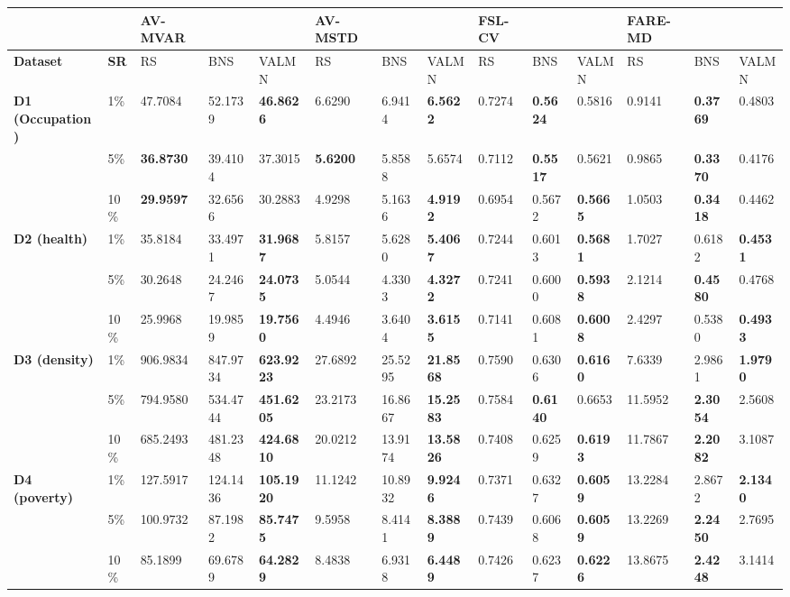 \begin{longtable}[]{@{}llllllllllllll@{}}
\toprule
& & AV-MVAR & & & AV-MSTD & & & FSL-CV & & & FARE-MD & &\tabularnewline
\midrule
\endhead
\textbf{Dataset} & \textbf{SR} & RS & BNS & VALMN & RS & BNS & VALMN &
RS & BNS & VALMN & RS & BNS & VALMN\tabularnewline
\textbf{D1 (Occupation)} & 1\% & 47.7084 & 52.1739 & \textbf{46.8626} &
6.6290 & 6.9414 & \textbf{6.5622} & 0.7274 & \textbf{0.5624} & 0.5816 &
0.9141 & \textbf{0.3769} & 0.4803\tabularnewline
& 5\% & \textbf{36.8730} & 39.4104 & 37.3015 & \textbf{5.6200} & 5.8588
& 5.6574 & 0.7112 & \textbf{0.5517} & 0.5621 & 0.9865 & \textbf{0.3370}
& 0.4176\tabularnewline
& 10\% & \textbf{29.9597} & 32.6566 & 30.2883 & 4.9298 & 5.1636 &
\textbf{4.9192} & 0.6954 & 0.5672 & \textbf{0.5665} & 1.0503 &
\textbf{0.3418} & 0.4462\tabularnewline
\textbf{D2 (health)} & 1\% & 35.8184 & 33.4971 & \textbf{31.9687} &
5.8157 & 5.6280 & \textbf{5.4067} & 0.7244 & 0.6013 & \textbf{0.5681} &
1.7027 & 0.6182 & \textbf{0.4531}\tabularnewline
& 5\% & 30.2648 & 24.2467 & \textbf{24.0735} & 5.0544 & 4.3303 &
\textbf{4.3272} & 0.7241 & 0.6000 & \textbf{0.5938} & 2.1214 &
\textbf{0.4580} & 0.4768\tabularnewline
& 10\% & 25.9968 & 19.9859 & \textbf{19.7560} & 4.4946 & 3.6404 &
\textbf{3.6155} & 0.7141 & 0.6081 & \textbf{0.6008} & 2.4297 & 0.5380 &
\textbf{0.4933}\tabularnewline
\textbf{D3 (density)} & 1\% & 906.9834 & 847.9734 & \textbf{623.9223} &
27.6892 & 25.5295 & \textbf{21.8568} & 0.7590 & 0.6306 & \textbf{0.6160}
& 7.6339 & 2.9861 & \textbf{1.9790}\tabularnewline
& 5\% & 794.9580 & 534.4744 & \textbf{451.6205} & 23.2173 & 16.8667 &
\textbf{15.2583} & 0.7584 & \textbf{0.6140} & 0.6653 & 11.5952 &
\textbf{2.3054} & 2.5608\tabularnewline
& 10\% & 685.2493 & 481.2348 & \textbf{424.6810} & 20.0212 & 13.9174 &
\textbf{13.5826} & 0.7408 & 0.6259 & \textbf{0.6193} & 11.7867 &
\textbf{2.2082} & 3.1087\tabularnewline
\textbf{D4 (poverty)} & 1\% & 127.5917 & 124.1436 & \textbf{105.1920} &
11.1242 & 10.8932 & \textbf{9.9246} & 0.7371 & 0.6327 & \textbf{0.6059}
& 13.2284 & 2.8672 & \textbf{2.1340}\tabularnewline
& 5\% & 100.9732 & 87.1982 & \textbf{85.7475} & 9.5958 & 8.4141 &
\textbf{8.3889} & 0.7439 & 0.6068 & \textbf{0.6059} & 13.2269 &
\textbf{2.2450} & 2.7695\tabularnewline
& 10\% & 85.1899 & 69.6789 & \textbf{64.2829} & 8.4838 & 6.9318 &
\textbf{6.4489} & 0.7426 & 0.6237 & \textbf{0.6226} & 13.8675 &
\textbf{2.4248} & 3.1414\tabularnewline
\bottomrule
\end{longtable}
